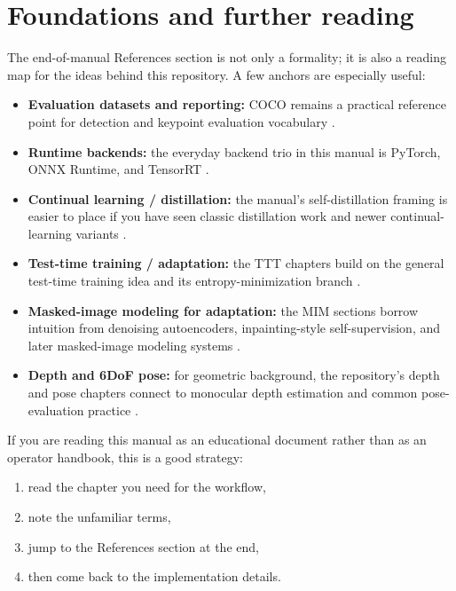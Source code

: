 \section{Foundations and further reading}
The end-of-manual References section is not only a formality; it is also a
reading map for the ideas behind this repository. A few anchors are especially
useful:
\begin{itemize}
  \item \textbf{Evaluation datasets and reporting:} COCO remains a practical reference point for detection and keypoint evaluation vocabulary \cite{lin2014coco}.
  \item \textbf{Runtime backends:} the everyday backend trio in this manual is PyTorch, ONNX Runtime, and TensorRT \cite{pytorch,onnxruntime,tensorrt}.
  \item \textbf{Continual learning / distillation:} the manual's self-distillation framing is easier to place if you have seen classic distillation work and newer continual-learning variants \cite{hinton2015distilling,furlanello2018bornagain,shenfeld2026sdft}.
  \item \textbf{Test-time training / adaptation:} the TTT chapters build on the general test-time training idea and its entropy-minimization branch \cite{sun2020ttt,wang2021tent,grandvalet2005entropy}.
  \item \textbf{Masked-image modeling for adaptation:} the MIM sections borrow intuition from denoising autoencoders, inpainting-style self-supervision, and later masked-image modeling systems \cite{vincent2008dae,pathak2016context,he2022mae,xie2022simmim,gandelsman2022tttmae,mansour2024tttmim}.
  \item \textbf{Depth and 6DoF pose:} for geometric background, the repository's depth and pose chapters connect to monocular depth estimation and common pose-evaluation practice \cite{eigen2014depth,ranftl2021dpt,zhou2019rot6d,hodan2016poseeval,hodan2020bop,labbe2020cosypose}.
\end{itemize}

If you are reading this manual as an educational document rather than as an
operator handbook, this is a good strategy:
\begin{enumerate}
  \item read the chapter you need for the workflow,
  \item note the unfamiliar terms,
  \item jump to the References section at the end,
  \item then come back to the implementation details.
\end{enumerate}



